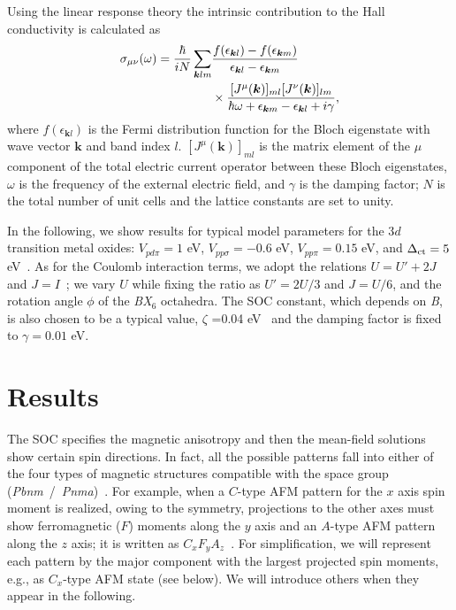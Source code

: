 \documentclass[aps,twocolumn,prb,preprintnumbers,amsmath,amssymb]{revtex4-2}
\begin{document}
Using the linear response theory the intrinsic contribution to the Hall conductivity is calculated as 
\begin{align}
\sigma_{\mu \nu}(\omega) = \frac{\hbar}{iN} \sum_{{\bm k}lm} &\frac{f(\epsilon_{{\bm k}l}) - f(\epsilon_{{\bm k}m})}{\epsilon_{{\bm k}l} - \epsilon_{{\bm k}m}} \notag \\
&\times \frac{[J^{\mu}(\bm k)]_{ml} [J^{\nu}(\bm k)]_{lm}}{\hbar \omega + \epsilon_{{\bm k}m} - \epsilon_{{\bm k}l} + i\gamma},
\label{sigma}
\end{align}
where $f(\epsilon_{{\bm k}l})$ is the Fermi distribution function for the Bloch eigenstate with wave vector $\bm k$ and band index $l$.
$[J^{\mu}(\bm k)]_{ml}$ is the matrix element of the $\mu$ component of the total electric current operator between these Bloch eigenstates, $\omega$ is the frequency of the external electric field, and $\gamma$ is the damping factor;  $N$ is the total number of unit cells and 
the lattice constants are set to unity.

In the following, we show results for typical model parameters for the 3$d$ transition metal oxides: 
 $V_{pd\pi}=1$ eV,  $V_{pp\sigma}=-0.6$ eV,  $V_{pp\pi}=0.15$ eV, and $\Delta_{\rm ct}=5$ eV~\cite{mizokawa}. 
As for the Coulomb interaction terms, we adopt the relations $U=U'+2J$ and $J=I$~\cite{sugano}; 
 we vary $U$ while fixing the ratio as $U'=2U/3$ and $J=U/6$, and the rotation angle $\phi$ of the {\it BX}$_6$ octahedra.
The SOC constant, which depends on {\it B}, is also chosen to be a typical value, $\zeta$ =0.04 eV~\cite{sugano} and the damping factor is fixed to $\gamma = 0.01$ eV.


\section{Results}

The SOC specifies the magnetic anisotropy and then the mean-field solutions show certain spin directions. 
In fact, all the possible patterns fall into either of the four types of magnetic structures 
 compatible with the space group ({\it Pbnm}\ /\ {\it Pnma})~\cite{treves,bertaut}. 
For example, when a $C$-type AFM pattern for the $x$ axis spin moment is realized, owing to the symmetry, 
 projections to the other axes must show ferromagnetic ($F$) moments along the $y$ axis and an $A$-type AFM pattern along the $z$ axis; 
 it is written as $C_x F_y A_z$~\cite{solovyev, bertaut2, zhou}. 
For simplification, we will represent each pattern by the major component with the largest projected spin moments, 
 e.g., as $C_x$-type AFM state (see below).
We will introduce others when they appear in the following.  
\end{document}
